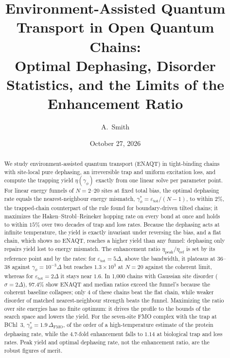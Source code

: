 \documentclass[aps,pre,preprint,floatfix]{revtex4-2}
\newcommand{\gp}{\gamma_\phi}
\newcommand{\gps}{\gamma_\phi^*}
\newcommand{\etap}{\eta_\text{peak}}
\newcommand{\etar}{\eta_\text{ref}}
\newcommand{\enh}{\etap/\etar}
\begin{document}
\title{Environment-Assisted Quantum Transport in Open Quantum Chains:\texorpdfstring{\\}{ }
       Optimal Dephasing, Disorder Statistics, and the Limits of the
       Enhancement Ratio}

\author{A.~Smith}

\date{October 27, 2026}

\begin{abstract}
We study environment-assisted quantum transport (ENAQT) in tight-binding chains
with site-local pure dephasing, an irreversible trap and uniform excitation
loss, and compute the trapping yield $\eta(\gp)$ exactly from one linear
solve per parameter point.
For linear energy funnels of $N=2$--$20$ sites at fixed total bias, the optimal
dephasing rate equals the nearest-neighbour energy mismatch,
$\gps=\varepsilon_\text{tot}/(N-1)$, to within $2\%$, the trapped-chain
counterpart of the rule found for boundary-driven tilted chains; it maximizes
the Haken--Strobl--Reineker hopping rate on every bond at once and holds to
within $15\%$ over two decades of trap and loss rates.
Because the dephasing acts at infinite temperature, the yield is exactly
invariant under reversing the bias, and a flat chain, which shows no ENAQT, reaches a higher yield
than any funnel: dephasing only repairs yield lost to energy mismatch.
The enhancement ratio $\enh$ is set by its reference point and by the rates:
for $\varepsilon_\text{tot}=5\Delta$, above the bandwidth, it plateaus at
$36$--$38$ against $\gp=10^{-3}\Delta$ but reaches $1.3\times10^{3}$ at $N=20$
against the coherent limit, whereas for $\varepsilon_\text{tot}=2\Delta$ it
stays near $1.6$.
In 1{,}000 chains with Gaussian site disorder ($\sigma=2\Delta$), $97.4\%$ show
ENAQT and median ratios exceed the funnel's because the coherent baseline
collapses; only 4 of these chains beat the flat chain, while weaker disorder of
matched nearest-neighbour strength beats the funnel.
Maximizing the ratio over site energies has no finite optimum: it drives the
profile to the bounds of the search space and lowers the yield.
For the seven-site FMO complex with the trap at BChl~3,
$\gps=1.9\,\Delta_\text{FMO}$, of the order of a high-temperature estimate
of the protein dephasing rate, while the $4.7$-fold enhancement
falls to $1.14$ at biological trap and loss rates.
Peak yield and optimal dephasing rate, not the enhancement ratio, are the
robust figures of merit.
\end{abstract}
\end{document}
